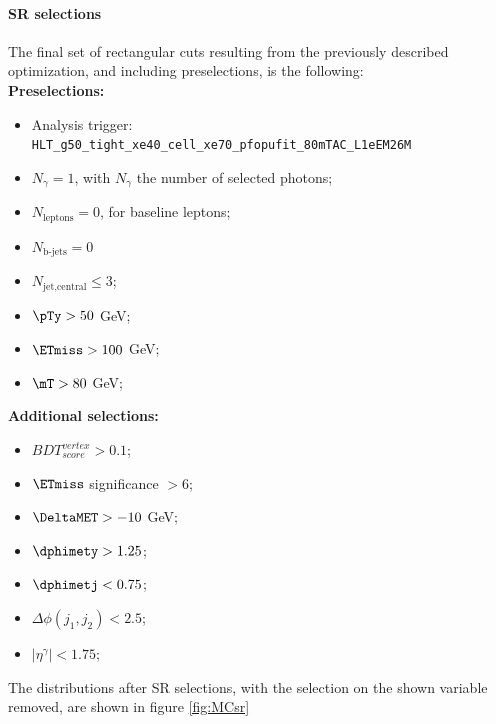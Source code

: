 \paragraph{SR selections}
The final set of rectangular cuts resulting from the previously described optimization, and including preselections, is the following:\\
\textbf{Preselections:}
\begin{itemize}[nosep]
    \item Analysis trigger: \texttt{HLT\_g50\_tight\_xe40\_cell\_xe70\_pfopufit\_80mTAC\_L1eEM26M}
    \item $N_{\gamma}=1$, with  $N_{\gamma}$ the number of selected photons;
    \item $N_{\text{leptons}}=0$, for baseline leptons;
    \item $N_{\text{b-jets}}=0$
    \item $N_{\text{jet,central}} \leq 3$;
    \item $\pTy > 50$ GeV;
    \item $\ETmiss > 100$ GeV;
    \item $\mT>80$ GeV;
\end{itemize}
\textbf{Additional selections:}
\begin{itemize}[nosep]
    \item $BDT_{score}^{vertex}>0.1$;
    \item $\ETmiss$ significance $> 6$;
    \item $\DeltaMET > -10$ GeV;
    \item $\dphimety>1.25$;
    \item $\dphimetj<0.75$;
    \item $\Delta\phi(j_1,j_2)<2.5$;
    \item $|\eta^\gamma|<1.75$;
\end{itemize}

The distributions after SR selections, with the selection on the shown variable removed, are shown in figure \ref{fig:MCsr}


